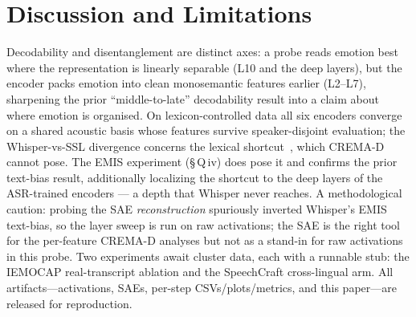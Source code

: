 \documentclass[sigconf,anonymous,nonacm]{acmart}
\begin{document}
\section{Discussion and Limitations}
Decodability and disentanglement are distinct axes: a probe reads emotion best where the representation is linearly separable (L10 and the deep layers), but the encoder packs emotion into clean monosemantic features earlier (L2--L7), sharpening the prior ``middle-to-late'' decodability result into a claim about where emotion is organised. On lexicon-controlled data all six encoders converge on a shared acoustic basis whose features survive speaker-disjoint evaluation; the Whisper-vs-SSL divergence concerns the lexical shortcut~\cite{ma2026lora}, which CREMA-D cannot pose. The EMIS experiment (\S\,Q\,iv) does pose it and confirms the prior text-bias result, additionally localizing the shortcut to the deep layers of the ASR-trained encoders --- a depth that Whisper never reaches. A methodological caution: probing the SAE \emph{reconstruction} spuriously inverted Whisper's EMIS text-bias, so the layer sweep is run on raw activations; the SAE is the right tool for the per-feature CREMA-D analyses but not as a stand-in for raw activations in this probe. Two experiments await cluster data, each with a runnable stub: the IEMOCAP real-transcript ablation and the SpeechCraft cross-lingual arm. All artifacts---activations, SAEs, per-step CSVs/plots/metrics, and this paper---are released for reproduction.



\end{document}
